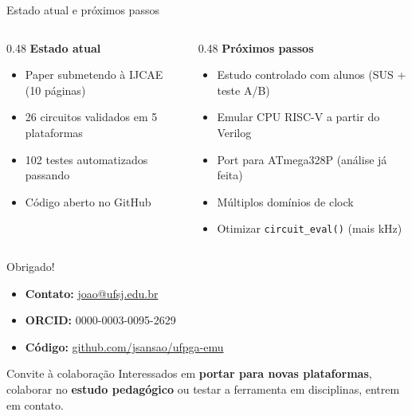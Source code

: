 \documentclass[10pt, aspectratio=169]{beamer}
\newcommand{\code}[1]{\texttt{\small #1}}
\begin{document}
\begin{frame}{Estado atual e próximos passos}
  \begin{columns}[t]
    \begin{column}{0.48\textwidth}
      \textbf{Estado atual}
      \begin{itemize}
        \item Paper submetendo à \alert{IJCAE} (10 páginas)
        \item 26 circuitos validados em 5 plataformas
        \item 102 testes automatizados passando
        \item Código aberto no GitHub
      \end{itemize}
    \end{column}
    \begin{column}{0.48\textwidth}
      \textbf{Próximos passos}
      \begin{itemize}
        \item Estudo controlado com alunos (SUS + teste A/B)
        \item Emular CPU \alert{RISC-V} a partir do Verilog
        \item Port para ATmega328P (análise já feita)
        \item Múltiplos domínios de clock
        \item Otimizar \code{circuit\_eval()} (mais kHz)
      \end{itemize}
    \end{column}
  \end{columns}
\end{frame}

\begin{frame}[plain]
  \centering
  \vspace{2em}
  {\Huge Obrigado!}

  \vspace{1.5em}
  \begin{itemize}
    \item \textbf{Contato:} \href{mailto:joao@ufsj.edu.br}{joao@ufsj.edu.br}
    \item \textbf{ORCID:} 0000-0003-0095-2629
    \item \textbf{Código:} \href{https://github.com/jsansao/ufpga-emu}{github.com/jsansao/ufpga-emu}
  \end{itemize}

  \vspace{1em}
  \begin{block}{Convite à colaboração}
    Interessados em \textbf{portar para novas plataformas}, colaborar no
    \textbf{estudo pedagógico} ou testar a ferramenta em disciplinas,
    entrem em contato.
  \end{block}
\end{frame}
\end{document}
